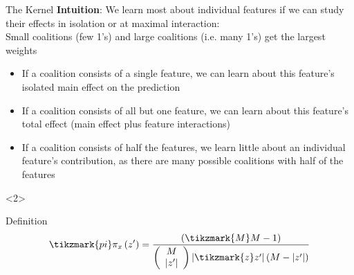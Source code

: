 \documentclass[11pt,compress,t,notes=noshow, aspectratio=169, xcolor=table]{beamer}
\begin{document}
\begin{vbframe}{The Kernel}
\textbf{Intuition}: We learn most about individual features if we can study their effects in isolation or at maximal interaction:\\
Small coalitions (few 1’s) and large coalitions (i.e. many 1’s) get the largest weights
\begin{itemize}
    \item If a coalition consists of a single feature, we can learn about this feature’s isolated main effect on the prediction
    \item If a coalition consists of all but one feature, we can learn about this feature’s total effect (main effect plus feature interactions)
    \item If a coalition consists of half the features, we learn little about an individual feature’s contribution, as there are many possible coalitions with half of the features
\end{itemize}

\begin{onlyenv}<2>
\begin{exampleblock}{Definition}
\[
\tikzmark{pi}\pi_{x}\left(z^{\prime}\right)=\frac{(
\tikzmark{M}M-1)}{\left(\begin{array}{c} M \\\left|z^{\prime}\right|\end{array}\right)\left|
\tikzmark{z}z^{\prime}\right|\left(M-\left|z^{\prime}\right|\right)}
\]
\end{exampleblock}
\end{onlyenv}





\end{vbframe}
\end{document}
